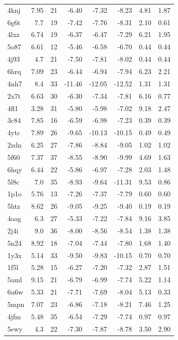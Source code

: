 {\begin{longtable}{lrrrrrrr}
4knj & 7.95 & 21 & -6.40 & -7.32 & -8.23 & 4.81 & 1.87\\
6g6t & 7.7 & 19 & -7.42 & -7.76 & -8.31 & 2.10 & 0.61\\
4lxz & 6.74 & 19 & -6.37 & -6.47 & -7.29 & 6.21 & 1.95\\
5o87 & 6.61 & 12 & -5.46 & -6.58 & -6.70 & 0.44 & 0.44\\
4j93 & 4.7 & 21 & -7.50 & -7.81 & -8.02 & 0.44 & 0.44\\
6hrq & 7.09 & 23 & -6.44 & -6.94 & -7.94 & 6.23 & 2.21\\
4nh7 & 8.4 & 33 & -11.46 & -12.05 & -12.52 & 1.31 & 1.31\\
2x7t & 6.63 & 30 & -6.30 & -7.34 & -7.81 & 6.16 & 0.77\\
4fl1 & 3.28 & 31 & -5.80 & -5.98 & -7.02 & 9.18 & 2.47\\
3c84 & 7.85 & 16 & -6.59 & -6.98 & -7.23 & 0.39 & 0.39\\
4ytc & 7.89 & 26 & -9.65 & -10.13 & -10.15 & 0.49 & 0.49\\
2zdn & 6.25 & 27 & -7.86 & -8.84 & -9.05 & 1.02 & 1.02\\
5f60 & 7.37 & 37 & -8.55 & -8.90 & -9.99 & 4.69 & 1.63\\
6hqy & 6.44 & 22 & -5.86 & -6.97 & -7.28 & 2.03 & 1.48\\
5l8c & 7.0 & 35 & -8.93 & -9.64 & -11.31 & 9.53 & 0.86\\
1p1o & 5.76 & 13 & -7.26 & -7.37 & -7.79 & 0.60 & 0.60\\
5htz & 8.62 & 26 & -9.05 & -9.25 & -9.40 & 0.19 & 0.19\\
4oag & 6.3 & 27 & -5.33 & -7.22 & -7.84 & 9.16 & 3.85\\
2j4i & 9.0 & 36 & -8.00 & -8.56 & -8.54 & 1.38 & 1.38\\
5n24 & 8.92 & 18 & -7.04 & -7.44 & -7.80 & 1.68 & 1.40\\
1y3x & 5.14 & 33 & -9.50 & -9.83 & -10.15 & 0.70 & 0.70\\
1f5l & 5.28 & 15 & -6.27 & -7.20 & -7.32 & 2.87 & 1.51\\
5aml & 9.15 & 21 & -6.79 & -6.99 & -7.74 & 5.22 & 1.14\\
6u6w & 5.33 & 21 & -7.71 & -7.69 & -8.04 & 5.13 & 0.33\\
5mpn & 7.07 & 23 & -6.86 & -7.18 & -8.21 & 7.46 & 1.25\\
4jfm & 5.48 & 35 & -6.54 & -7.29 & -7.74 & 0.97 & 0.97\\
5ewy & 4.3 & 22 & -7.30 & -7.87 & -8.78 & 3.50 & 2.90\\

\end{longtable}}
